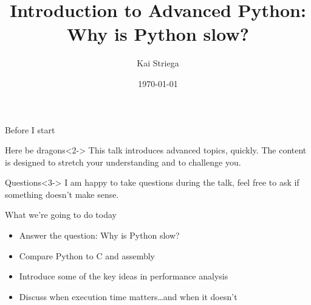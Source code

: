 \documentclass[12pt, aspectration=169]{beamer}
\title{Introduction to Advanced Python:\\Why is Python slow?}
\author{Kai Striega}
\date{\today}
\begin{document}
    \maketitle

    \begin{frame}{Before I start}
        \begin{block}{Here be dragons}<2->
            This talk introduces advanced topics, quickly.
            The content is designed to stretch your understanding and to challenge you.
        \end{block}
        \begin{block}{Questions}<3->
            I am happy to take questions during the talk, feel free to ask if something doesn't make sense.
        \end{block}
    \end{frame}

    \begin{frame}{What we're going to do today}
        \begin{itemize}
            \item<2-> Answer the question: Why is Python slow?
            \item<3-> Compare Python to C and assembly
            \item<4-> Introduce some of the key ideas in performance analysis
            \item<5-> Discuss when execution time matters\ldots and when it doesn't
        \end{itemize}
    \end{frame}
\end{document}
